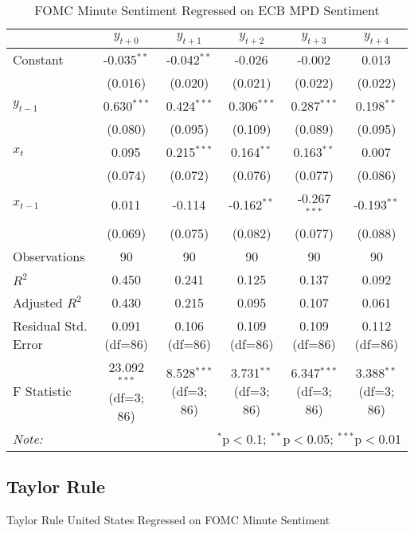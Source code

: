 \documentclass [12pt]{article}
\begin{document}
\begin{table}[H] \centering
  \caption{FOMC Minute Sentiment Regressed on ECB MPD Sentiment}
  \begin{adjustbox}{width=\textwidth}
\begin{tabular}{lccccc}
\hline
\hline
 & $y_{t+0}$ & $y_{t+1}$ & $y_{t+2}$ & $y_{t+3}$ & $y_{t+4}$  \\
\hline
 Constant & -0.035$^{**}$ & -0.042$^{**}$ & -0.026$^{}$ & -0.002$^{}$ & 0.013$^{}$ \\
& (0.016) & (0.020) & (0.021) & (0.022) & (0.022) \\
 $y_{t-1}$ & 0.630$^{***}$ & 0.424$^{***}$ & 0.306$^{***}$ & 0.287$^{***}$ & 0.198$^{**}$ \\
& (0.080) & (0.095) & (0.109) & (0.089) & (0.095) \\
 $x_{t}$ & 0.095$^{}$ & 0.215$^{***}$ & 0.164$^{**}$ & 0.163$^{**}$ & 0.007$^{}$ \\
& (0.074) & (0.072) & (0.076) & (0.077) & (0.086) \\
 $x_{t-1}$ & 0.011$^{}$ & -0.114$^{}$ & -0.162$^{**}$ & -0.267$^{***}$ & -0.193$^{**}$ \\
& (0.069) & (0.075) & (0.082) & (0.077) & (0.088) \\
\hline
 Observations & 90 & 90 & 90 & 90 & 90 \\
 $R^2$ & 0.450 & 0.241 & 0.125 & 0.137 & 0.092 \\
 Adjusted $R^2$ & 0.430 & 0.215 & 0.095 & 0.107 & 0.061 \\
 Residual Std. Error & 0.091 (df=86) & 0.106 (df=86) & 0.109 (df=86) & 0.109 (df=86) & 0.112 (df=86) \\
 F Statistic & 23.092$^{***}$ (df=3; 86) & 8.528$^{***}$ (df=3; 86) & 3.731$^{**}$ (df=3; 86) & 6.347$^{***}$ (df=3; 86) & 3.388$^{**}$ (df=3; 86) \\
\hline
\hline
\textit{Note:} & \multicolumn{5}{r}{$^{*}$p$<$0.1; $^{**}$p$<$0.05; $^{***}$p$<$0.01} \\
\end{tabular}
\end{adjustbox}
\end{table}

\subsection{Taylor Rule}

Taylor Rule United States Regressed on FOMC Minute Sentiment
\end{document}
